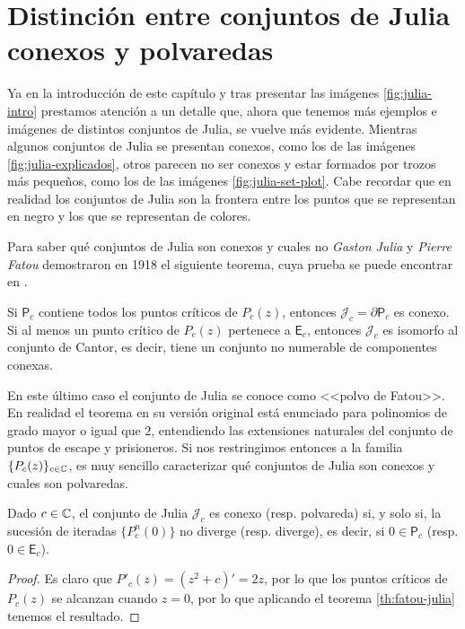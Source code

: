 \section{Distinción entre conjuntos de Julia conexos y polvaredas}
\label{section:conexos-polvaredas}

Ya en la introducción de este capítulo y tras presentar las imágenes \ref{fig:julia-intro} prestamos atención a un detalle que, ahora que tenemos más ejemplos e imágenes de distintos conjuntos de Julia, se vuelve más evidente. Mientras algunos conjuntos de Julia se presentan conexos, como los de las imágenes \ref{fig:julia-explicados}, otros parecen no ser conexos y estar formados por trozos más pequeños, como los de las imágenes \ref{fig:julia-set-plot}. Cabe recordar que en realidad los conjuntos de Julia son la frontera entre los puntos que se representan en negro y los que se representan de colores.

Para saber qué conjuntos de Julia son conexos y cuales no \textit{Gaston Julia} y \textit{Pierre Fatou} demostraron en 1918 el siguiente teorema, cuya prueba se puede encontrar en \cite[Theorem 9.5]{John-Milnor}.

\begin{teorema}
  \label{th:fatou-julia}
  Si $\mathsf{P}_c$ contiene todos los puntos críticos de $P_c(z)$, entonces $\mathcal{J}_c=\partial \mathsf{P}_c$ es conexo. Si al menos un punto crítico de $P_c(z)$ pertenece a $\mathsf{E}_c$, entonces $\mathcal{J}_c$ es isomorfo al conjunto de Cantor, es decir, tiene un conjunto no numerable de componentes conexas. 
\end{teorema}

En este último caso el conjunto de Julia se conoce como <<polvo de Fatou>>. En realidad el teorema en su versión original está enunciado para polinomios de grado mayor o igual que $2$, entendiendo las extensiones naturales del conjunto de puntos de escape y prisioneros. Si nos restringimos entonces a la familia $\{P_c(z)\}_{c\in\mathbb{C}}$, es muy sencillo caracterizar qué conjuntos de Julia son conexos y cuales son polvaredas.

\begin{corolario}
  \label{th:conexo-polvareda}
  Dado $c\in\mathbb{C}$, el conjunto de Julia $\mathcal{J}_c$ es conexo (resp. polvareda) si, y solo si, la sucesión de iteradas $\{P_c^n(0)\}$ no diverge (resp. diverge), es decir, si $0\in\mathsf{P}_c$ (resp. $0\in\mathsf{E}_c$).
\end{corolario}
\begin{proof}
  Es claro que $P'_c(z)=(z^2+c)'=2z$, por lo que los puntos críticos de $P_c(z)$ se alcanzan cuando $z=0$, por lo que aplicando el teorema \ref{th:fatou-julia} tenemos el resultado.
\end{proof}

